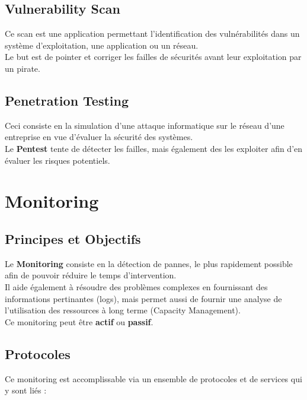 \documentclass{report}
\begin{document}
	\section{Vulnerability Scan}

		Ce scan est une application permettant l'identification des vulnérabilités dans un système d'exploitation, une application ou un réseau.\\
		Le but est de pointer et corriger les failles de sécurités avant leur exploitation par un pirate.\\

	\section{Penetration Testing}

		Ceci consiste en la simulation d'une attaque informatique sur le réseau d'une entreprise en vue d'évaluer la sécurité des systèmes.\\
		Le \textbf{Pentest} tente de détecter les failles, mais également des les exploiter afin d'en évaluer les risques potentiels.\\

\chapter{Monitoring}

	\section{Principes et Objectifs}

		Le \textbf{Monitoring} consiste en la détection de pannes, le plus rapidement possible afin de pouvoir réduire le temps d'intervention.\\

		Il aide également à résoudre des problèmes complexes en fournissant des informations pertinantes (logs), mais permet aussi de fournir une analyse de l'utilisation des ressources à long terme (Capacity Management).\\

		Ce monitoring peut être \textbf{actif} ou \textbf{passif}.\\

	\section{Protocoles}

		Ce monitoring est accomplissable via un ensemble de protocoles et de services qui y sont liés : \\
\end{document}
